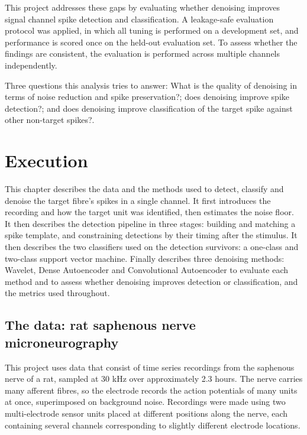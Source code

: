 \documentclass[ %
                    author={Rzan Alkabier},
                    supervisor={Dr. Zahraa Abdallah},
                    degree={MSc},
                     title={Denoising Extracellular Recording for Spike Detection and Classification on Single Channels},
                    subtitle={Does denoising improve detection and classification performance?},
                      type={},
                      year={2026}]{dissertation}
\begin{document}
\noindent
This project addresses these gaps by evaluating whether denoising improves signal channel spike detection and classification. A leakage-safe evaluation protocol was applied, in which all tuning is performed on a development set, and performance is scored once on the held-out evaluation set. To assess whether the findings are consistent, the evaluation is performed across multiple channels independently. 
\bigskip

\noindent
Three questions this analysis tries to answer: What is the quality of denoising in terms of noise reduction and spike preservation?; does denoising improve spike detection?; and does denoising improve classification of the target spike against other non-target spikes?. 
\chapter{Execution}
\label{chap:execution}
This chapter describes the data and the methods used to detect, classify and denoise the target fibre's spikes in a single channel. It first introduces the recording and how the target unit was identified, then estimates the noise floor. It then describes the detection pipeline in three stages: building and matching a spike template, and constraining detections by their timing after the stimulus. It then describes the two classifiers used on the detection survivors: a one-class and two-class support vector machine. Finally describes three denoising methods: Wavelet, Dense Autoencoder and Convolutional Autoencoder to evaluate each method and to assess whether denoising improves detection or classification, and the metrics used throughout. 

\section{The data: rat saphenous nerve microneurography}
This project uses data that consist of time series recordings from the saphenous nerve of a rat, sampled at 30 kHz over approximately 2.3 hours. The nerve carries many afferent fibres, so the electrode records the action potentials of many units at once, superimposed on background noise. Recordings were made using two multi-electrode sensor units placed at different positions along the nerve, each containing several channels corresponding to slightly different electrode locations.
\hspace{0.5cm}
\end{document}
